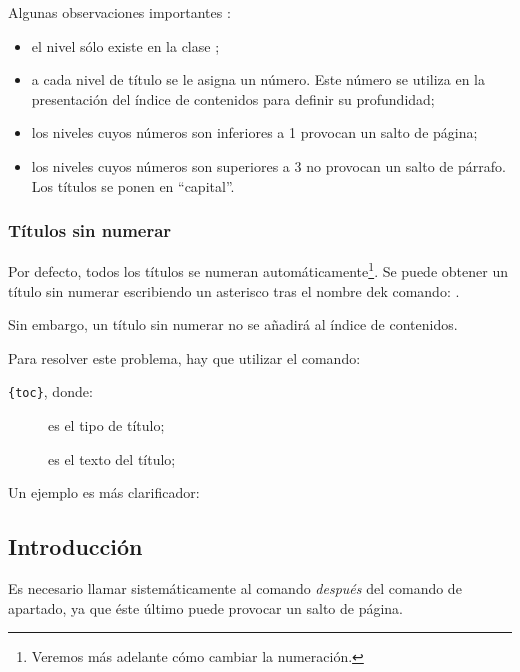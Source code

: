 Algunas observaciones importantes :
\begin{itemize}
\item el nivel  sólo existe en la clase ;
\item a cada nivel de título se le asigna un número. Este número se utiliza en la presentación del índice de contenidos para definir su profundidad;\label{numeroniveau}
\item los niveles cuyos números son inferiores a 1 provocan un salto de página;
\item los niveles cuyos números son superiores a 3 no provocan un salto de párrafo. Los títulos se ponen en  \enquote{capital}. %
\end{itemize}

\subsection{Títulos sin numerar}\label{titresansnumero}

Por defecto, todos los títulos se numeran automáticamente\footnote{Veremos más adelante cómo cambiar la numeración.}. Se puede obtener un título sin numerar escribiendo un asterisco tras el nombre dek comando: .


Sin embargo, un título sin numerar no se añadirá al índice de contenidos. 

Para resolver este problema, hay que utilizar el comando:

\verb|{toc}|, donde: \label{addcontentsline}

\begin{description}
    \item[] es el tipo de título;
    \item[] es el texto del título;
\end{description}

Un ejemplo es más clarificador:


\begin{latexcode}
\chapter*{Introducción}
\end{latexcode}

\begin{attention}
Es necesario llamar sistemáticamente al comando  \emph{después} del comando de apartado, ya que éste último puede provocar un salto de página.
\end{attention}

